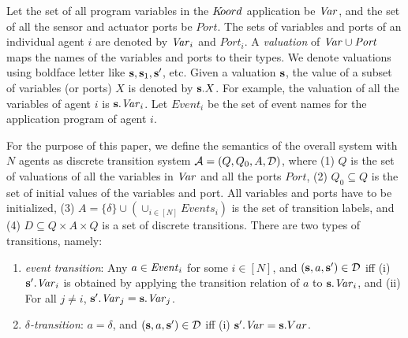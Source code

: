 %
Let the set of all program variables in the $K\kern-2pt oord$ application be $\mathit{Var}$, and the set of all the sensor and actuator ports be $\mathit{Port}$. 
%
The sets of variables and ports of an individual agent $i$ are denoted by $\mathit{Var}_i$ and  $\mathit{Port}_i$.
%
A {\em valuation\/} of $\mathit{Var} \cup \mathit{Port}$ maps the names of the variables and ports to their types. 
We denote valuations using boldface letter like ${\textbf{s}}, {\textbf{s}}_1, {\textbf{s}}'$, etc. 
%
Given a valuation ${\textbf{s}}$, the value of a subset of  variables (or ports) $X$ is denoted by ${\textbf{s}}.X$. For example, the  valuation of all the variables of agent $i$ is ${\textbf{s}}.\mathit{Var}_i$.
%
Let $\mathit{Event}_i$ be the set of event names for the application program of agent $i$. 
%

%
%
For the purpose of this paper, we define the  semantics of the overall system with $N$ agents as discrete transition system $\mathcal{A} = (Q, Q_0, A, \mathcal{D})$,
where 
(1) $Q$ is the set of valuations of all the variables in $\mathit{Var}$ and all the ports $\mathit{Port}$, 
(2) $Q_0 \subseteq Q$ is the set of initial values of the variables and port. All variables and ports have to be initialized, 
(3) $A = \{\delta\} \cup \left( \cup_{i \in [N]} \mathit{Events}_i \right)$ is the set of transition labels, and
(4) $D \subseteq Q \times A \times Q$ is a set of discrete transitions. There are two types of transitions, namely:
\begin{enumerate}
	\item {\em event transition}: Any $a \in \mathit{Event}_i$ for some $i \in [N]$, and  $({\textbf{s}},a,{\textbf{s}}') \in \mathcal{D}$ iff (i) ${\textbf{s}}'.\mathit{Var}_i$ is obtained by applying the transition relation of $a$ to ${\textbf{s}}.\mathit{Var}_i$, and 
		(ii) For all $j \neq i$, 
		${\textbf{s}}'.\mathit{Var}_j = {\textbf{s}}.\mathit{Var}_j$.
	\item {\em $\delta$-transition}: $a = \delta$, and $({\textbf{s}},a,{\textbf{s}}') \in \mathcal{D}$ iff (i) ${\textbf{s}}'.\mathit{Var} = {\textbf{s}}.Var$. 
\end{enumerate}
%


